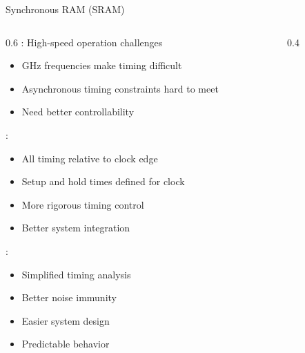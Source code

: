 \begin{frame}{Synchronous RAM (SRAM)}
\begin{columns}
\begin{column}{0.6\textwidth}
: High-speed operation challenges
\begin{itemize}
\item GHz frequencies make timing difficult
\item Asynchronous timing constraints hard to meet
\item Need better controllability
\end{itemize}
\vspace{0.3cm}
:
\begin{itemize}
\item All timing relative to clock edge
\item Setup and hold times defined for clock
\item More rigorous timing control
\item Better system integration
\end{itemize}
\vspace{0.3cm}
:
\begin{itemize}
\item Simplified timing analysis
\item Better noise immunity
\item Easier system design
\item Predictable behavior
\end{itemize}
\end{column}
\begin{column}{0.4\textwidth}
\begin{center}

\end{center}
\end{column}
\end{columns}
\end{frame}

